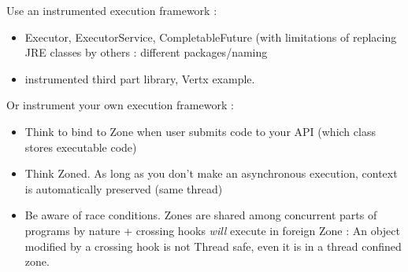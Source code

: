 Use an instrumented execution framework :
\begin{itemize}
\item Executor, ExecutorService, CompletableFuture (with limitations of replacing JRE classes by others : different packages/naming
\item instrumented third part library, Vertx example.
\end{itemize}

Or instrument your own execution framework :
\begin{itemize}
\item Think to bind to Zone when user submits code to your API (which class stores executable code)
\item Think Zoned. As long as you don't make an asynchronous execution, context is automatically preserved (same thread)
\item Be aware of race conditions. Zones are shared among concurrent parts of programs by nature + crossing hooks \emph{will} execute in foreign Zone : An object modified by a crossing hook is not Thread safe, even it is in a thread confined zone.
\end{itemize}